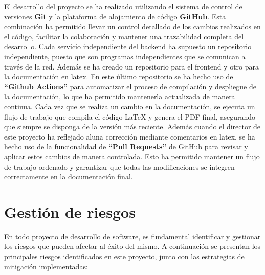 El desarrollo del proyecto se ha realizado utilizando el sistema de control de versiones \textbf{Git} y la plataforma de alojamiento de código \textbf{GitHub}. Esta combinación ha permitido llevar un control detallado de los cambios realizados en el código, facilitar la colaboración y mantener una trazabilidad completa del desarrollo.
\newline\newline
Cada servicio independiente del backend ha supuesto un repositorio independiente, puesto que son programas independientes que se comunican a través de la red. Además se ha creado un repositorio para el frontend y otro para la documentación en latex.
\newline\newline
En este último repositorio se ha hecho uso de \textbf{``Github Actions''} para automatizar el proceso de compilación y despliegue de la documentación, lo que ha permitido mantenerla actualizada de manera continua. Cada vez que se realiza un cambio en la documentación, se ejecuta un flujo de trabajo que compila el código LaTeX y genera el PDF final, asegurando que siempre se disponga de la versión más reciente.
\newline
Además cuando el director de este proyecto ha reflejado aluna corrección mediante comentarios en latex, se ha hecho uso de la funcionalidad de \textbf{``Pull Requests''} de GitHub para revisar y aplicar estos cambios de manera controlada. Esto ha permitido mantener un flujo de trabajo ordenado y garantizar que todas las modificaciones se integren correctamente en la documentación final.

\section{Gestión de riesgos}

En todo proyecto de desarrollo de software, es fundamental identificar y gestionar los riesgos que pueden afectar al éxito del mismo. A continuación se presentan los principales riesgos identificados en este proyecto, junto con las estrategias de mitigación implementadas:

